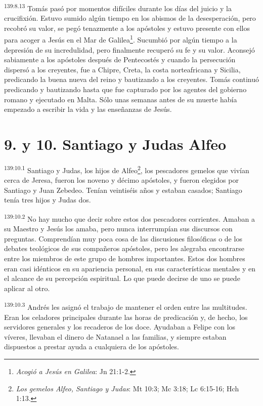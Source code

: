 \par
\textsuperscript{139:8.13} Tomás pasó por momentos difíciles durante los días del juicio y la crucifixión. Estuvo sumido algún tiempo en los abismos de la desesperación, pero recobró su valor, se pegó tenazmente a los apóstoles y estuvo presente con ellos para acoger a Jesús en el Mar de Galilea\footnote{\textit{Acogió a Jesús en Galilea}: Jn 21:1-2.}. Sucumbió por algún tiempo a la depresión de su incredulidad, pero finalmente recuperó su fe y su valor. Aconsejó sabiamente a los apóstoles después de Pentecostés y cuando la persecución dispersó a los creyentes, fue a Chipre, Creta, la costa norteafricana y Sicilia, predicando la buena nueva del reino y bautizando a los creyentes. Tomás continuó predicando y bautizando hasta que fue capturado por los agentes del gobierno romano y ejecutado en Malta. Sólo unas semanas antes de su muerte había empezado a escribir la vida y las enseñanzas de Jesús.

\section*{9. y 10. Santiago y Judas Alfeo}
\par
\textsuperscript{139:10.1} Santiago y Judas, los hijos de Alfeo\footnote{\textit{Los gemelos Alfeo, Santiago y Judas}: Mt 10:3; Mc 3:18; Lc 6:15-16; Hch 1:13.}, los pescadores gemelos que vivían cerca de Jeresa, fueron los noveno y décimo apóstoles, y fueron elegidos por Santiago y Juan Zebedeo. Tenían veintiséis años y estaban casados; Santiago tenía tres hijos y Judas dos.

\par
\textsuperscript{139:10.2} No hay mucho que decir sobre estos dos pescadores corrientes. Amaban a su Maestro y Jesús los amaba, pero nunca interrumpían sus discursos con preguntas. Comprendían muy poca cosa de las discusiones filosóficas o de los debates teológicos de sus compañeros apóstoles, pero les alegraba encontrarse entre los miembros de este grupo de hombres importantes. Estos dos hombres eran casi idénticos en su apariencia personal, en sus características mentales y en el alcance de su percepción espiritual. Lo que puede decirse de uno se puede aplicar al otro.

\par
\textsuperscript{139:10.3} Andrés les asignó el trabajo de mantener el orden entre las multitudes. Eran los celadores principales durante las horas de predicación y, de hecho, los servidores generales y los recaderos de los doce. Ayudaban a Felipe con los víveres, llevaban el dinero de Natanael a las familias, y siempre estaban dispuestos a prestar ayuda a cualquiera de los apóstoles.

